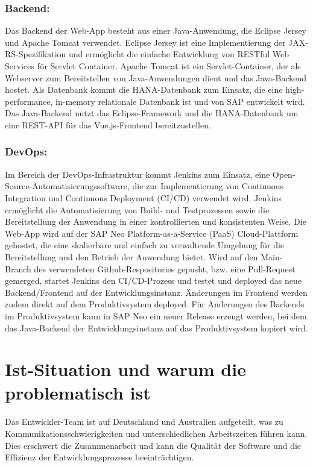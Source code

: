 \subsubsection*{Backend:}

Das Backend der Web-App besteht aus einer Java-Anwendung, die Eclipse Jersey und Apache Tomcat verwendet. 
Eclipse Jersey ist eine Implementierung der JAX-RS-Spezifikation 
und ermöglicht die einfache Entwicklung von RESTful Web Services für Servlet Container. 
Apache Tomcat ist ein Servlet-Container, der als Webserver zum Bereitstellen von Java-Anwendungen dient
und das Java-Backend hostet.
Als Datenbank kommt die HANA-Datenbank zum Einsatz, die eine high-performance, in-memory relationale Datenbank ist 
und von SAP entwickelt wird. 
Das Java-Backend nutzt das Eclipse-Framework und die HANA-Datenbank um eine REST-API für das 
Vue.js-Frontend bereitzustellen. 

\subsubsection*{DevOps:}

Im Bereich der DevOps-Infrastruktur kommt Jenkins zum Einsatz, 
eine Open-Source-Automatisierungssoftware, 
die zur Implementierung von Continuous Integration und Continuous Deployment (CI/CD) verwendet wird. 
Jenkins ermöglicht die Automatisierung von Build- und Testprozessen sowie die Bereitstellung 
der Anwendung in einer kontrollierten und konsistenten Weise. 
Die Web-App wird auf der SAP Neo Platform-as-a-Service (PaaS) Cloud-Plattform gehostet, 
die eine skalierbare und einfach zu verwaltende Umgebung für die Bereitstellung 
und den Betrieb der Anwendung bietet.
Wird auf den Main-Branch des verwendeten Github-Respositories gepusht, bzw. eine Pull-Request gemerged,
startet Jenkins den CI/CD-Prozess und testet und deployed das neue Backend/Frontend auf der Entwicklungsinstanz. 
Änderungen im Frontend werden zudem direkt auf dem Produktivsystem deployed. 
Für Änderungen des Backends im Produktivsystem kann in SAP Neo ein neuer Release erzeugt werden, 
bei dem das Java-Backend der Entwicklungsinstanz auf das Produktivsystem kopiert wird. 


\section{Ist-Situation und warum die problematisch ist}

Das Entwickler-Team ist auf Deutschland und Australien aufgeteilt, 
was zu Kommunikationsschwierigkeiten und unterschiedlichen Arbeitszeiten führen kann. 
Dies erschwert die Zusammenarbeit und kann die Qualität der Software und die Effizienz 
der Entwicklungsprozesse beeinträchtigen.

